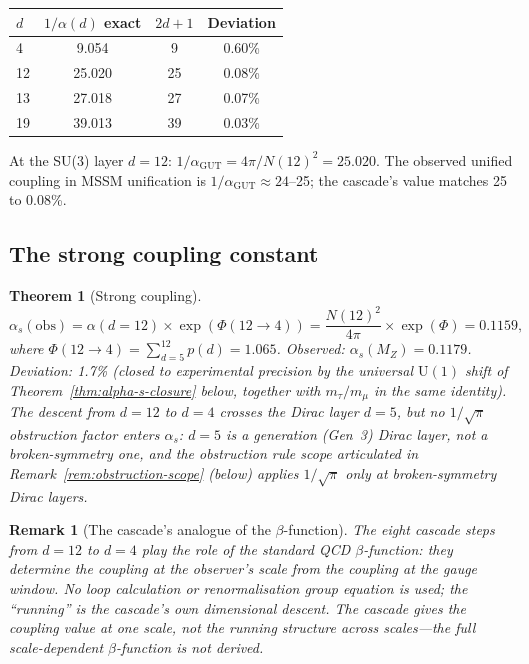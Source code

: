 \documentclass[12pt,a4paper]{article}
\newtheorem{theorem}{Theorem}[section]
\newtheorem*{remark}{Remark}
\begin{document}
\begin{center}
\begin{tabular}{lccc}
\hline
$d$ & $1/\alpha(d)$ exact & $2d + 1$ & Deviation \\
\hline
4 & 9.054 & 9 & 0.60\% \\
12 & 25.020 & 25 & 0.08\% \\
13 & 27.018 & 27 & 0.07\% \\
19 & 39.013 & 39 & 0.03\% \\
\hline
\end{tabular}
\end{center}

At the SU(3) layer $d = 12$: $1/\alpha_{\text{GUT}} = 4\pi/N(12)^2 = 25.020$. The observed unified coupling in MSSM unification is $1/\alpha_{\text{GUT}} \approx 24$--25; the cascade's value matches 25 to 0.08\%.

\subsection{The strong coupling constant}

\begin{theorem}[Strong coupling]\label{thm:alpha-s-leading}
\[
\alpha_s(\text{obs}) = \alpha(d = 12) \times \exp(\Phi(12 \to 4)) = \frac{N(12)^2}{4\pi} \times \exp(\Phi) = 0.1159,
\]
where $\Phi(12 \to 4) = \sum_{d=5}^{12} p(d) = 1.065$. Observed: $\alpha_s(M_Z) = 0.1179$. Deviation: 1.7\% (closed to experimental precision by the universal $\mathrm{U}(1)$ shift of Theorem~\ref{thm:alpha-s-closure} below, together with $m_\tau/m_\mu$ in the same identity). The descent from $d=12$ to $d=4$ crosses the Dirac layer $d=5$, but no $1/\sqrt{\pi}$ obstruction factor enters $\alpha_s$: $d=5$ is a generation (Gen~3) Dirac layer, not a broken-symmetry one, and the obstruction rule scope articulated in Remark~\ref{rem:obstruction-scope} (below) applies $1/\sqrt{\pi}$ only at broken-symmetry Dirac layers.
\end{theorem}

\begin{remark}[The cascade's analogue of the $\beta$-function]
The eight cascade steps from $d = 12$ to $d = 4$ play the role of the standard QCD $\beta$-function: they determine the coupling at the observer's scale from the coupling at the gauge window. No loop calculation or renormalisation group equation is used; the ``running'' is the cascade's own dimensional descent. The cascade gives the coupling value at one scale, not the running structure across scales---the full scale-dependent $\beta$-function is not derived.
\end{remark}
\end{document}
